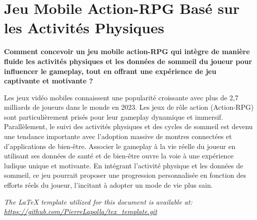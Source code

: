 \maketitle

\section*{Jeu Mobile Action-RPG Basé sur les Activités Physiques}\label{sec:sujet}
\textbf
{Comment concevoir un jeu mobile action-RPG qui intègre de manière fluide les activités physiques et les données de
sommeil du joueur pour influencer le gameplay, tout en offrant une expérience de jeu captivante et motivante ? }

Les jeux vidéo mobiles connaissent une popularité croissante avec plus de 2,7 milliards de joueurs dans le monde en
2023.
Les jeux de rôle action (Action-RPG) sont particulièrement prisés pour leur gameplay dynamique et immersif.
Parallèlement, le suivi des activités physiques et des cycles de sommeil est devenu une tendance importante avec
l'adoption massive de montres connectées et d'applications de bien-être.
Associer le gameplay à la vie réelle du joueur en utilisant ses données de santé et de bien-être ouvre la voie à une
expérience ludique unique et motivante.
En intégrant l’activité physique et les données de sommeil, ce jeu pourrait proposer une progression personnalisée en
fonction des efforts réels du joueur, l’incitant à adopter un mode de vie plus sain.

\tableofcontents

\vfill
\begin{center}
    \textit{The \LaTeX{} template utilized for this document is available at:
    \url{https://github.com/PierreLapolla/tex_template.git}}
\end{center}
\newpage